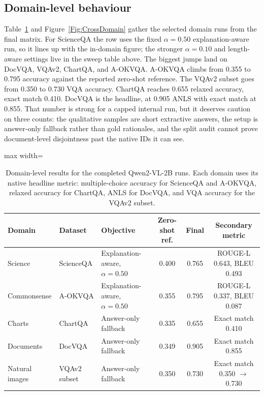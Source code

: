 \documentclass[preprint,12pt]{elsarticle}
\begin{document}
\subsection{Domain-level behaviour}
Table~\ref{tab:domain_results} and Figure~\ref{Fig:CrossDomain} gather the selected domain runs from the final matrix.
For ScienceQA the row uses the fixed $\alpha=0.50$ explanation-aware run, so it lines up with the in-domain figure; the stronger $\alpha=0.10$ and length-aware settings live in the sweep table above.
The biggest jumps land on DocVQA, VQAv2, ChartQA, and A-OKVQA.
A-OKVQA climbs from 0.355 to 0.795 accuracy against the reported zero-shot reference.
The VQAv2 subset goes from 0.350 to 0.730 VQA accuracy.
ChartQA reaches 0.655 relaxed accuracy, exact match 0.410.
DocVQA is the headline, at 0.905 ANLS with exact match at 0.855.
That number is strong for a capped internal run, but it deserves caution on three counts: the qualitative samples are short extractive answers, the setup is answer-only fallback rather than gold rationales, and the split audit cannot prove document-level disjointness past the native IDs it can see.

\begin{table}[!ht]
\centering
\caption{Domain-level results for the completed Qwen2-VL-2B runs. Each domain uses its native headline metric: multiple-choice accuracy for ScienceQA and A-OKVQA, relaxed accuracy for ChartQA, ANLS for DocVQA, and VQA accuracy for the VQAv2 subset.}
\label{tab:domain_results}
\scriptsize
\begin{adjustbox}{max width=\textwidth}
\begin{tabular}{|l|l|l|c|c|c|}
\hline
\textbf{Domain} & \textbf{Dataset} & \textbf{Objective} & \textbf{Zero-shot ref.} & \textbf{Final} & \textbf{Secondary metric} \\ \hline
Science & ScienceQA & Explanation-aware, $\alpha=0.50$ & 0.400 & 0.765 & ROUGE-L 0.643, BLEU 0.493 \\
Commonsense & A-OKVQA & Explanation-aware, $\alpha=0.50$ & 0.355 & 0.795 & ROUGE-L 0.337, BLEU 0.087 \\
Charts & ChartQA & Answer-only fallback & 0.335 & 0.655 & Exact match 0.410 \\
Documents & DocVQA & Answer-only fallback & 0.349 & 0.905 & Exact match 0.855 \\
Natural images & VQAv2 subset & Answer-only fallback & 0.350 & 0.730 & Exact match 0.350 $\rightarrow$ 0.730 \\ \hline
\end{tabular}
\end{adjustbox}
\end{table}
\end{document}
